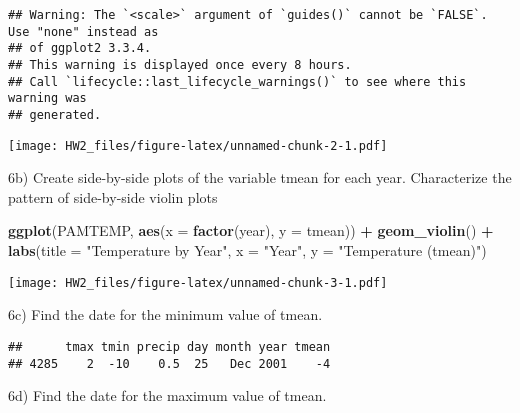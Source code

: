 \documentclass[
]{article}
\newenvironment{Shaded}{\begin{snugshade}}{\end{snugshade}}
\newcommand{\AttributeTok}[1]{\textcolor[rgb]{0.13,0.29,0.53}{#1}}
\newcommand{\FunctionTok}[1]{\textcolor[rgb]{0.13,0.29,0.53}{\textbf{#1}}}
\newcommand{\NormalTok}[1]{#1}
\newcommand{\SpecialCharTok}[1]{\textcolor[rgb]{0.81,0.36,0.00}{\textbf{#1}}}
\newcommand{\StringTok}[1]{\textcolor[rgb]{0.31,0.60,0.02}{#1}}
\begin{document}
\begin{verbatim}
## Warning: The `<scale>` argument of `guides()` cannot be `FALSE`. Use "none" instead as
## of ggplot2 3.3.4.
## This warning is displayed once every 8 hours.
## Call `lifecycle::last_lifecycle_warnings()` to see where this warning was
## generated.
\end{verbatim}

\texttt{[image: HW2\_files/figure-latex/unnamed-chunk-2-1.pdf]}

6b) Create side-by-side plots of the variable tmean for each year.
Characterize the pattern of side-by-side violin plots

\begin{Shaded}
\begin{Highlighting}[]
\FunctionTok{ggplot}\NormalTok{(PAMTEMP, }\FunctionTok{aes}\NormalTok{(}\AttributeTok{x =} \FunctionTok{factor}\NormalTok{(year), }\AttributeTok{y =}\NormalTok{ tmean)) }\SpecialCharTok{+}
  \FunctionTok{geom\_violin}\NormalTok{() }\SpecialCharTok{+}
  \FunctionTok{labs}\NormalTok{(}\AttributeTok{title =} \StringTok{"Temperature by Year"}\NormalTok{, }\AttributeTok{x =} \StringTok{"Year"}\NormalTok{, }\AttributeTok{y =} \StringTok{"Temperature (tmean)"}\NormalTok{)}
\end{Highlighting}
\end{Shaded}

\texttt{[image: HW2\_files/figure-latex/unnamed-chunk-3-1.pdf]}

6c) Find the date for the minimum value of tmean.

\begin{Shaded}
\end{Shaded}

\begin{verbatim}
##      tmax tmin precip day month year tmean
## 4285    2  -10    0.5  25   Dec 2001    -4
\end{verbatim}

6d) Find the date for the maximum value of tmean.

\begin{Shaded}
\end{Shaded}
\end{document}

